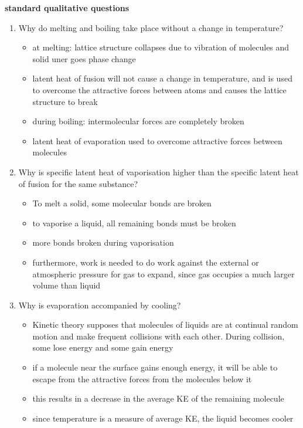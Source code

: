 \documentclass[a4paper, 10pt]{article}
\begin{document}
\textbf{standard qualitative questions}
\begin{enumerate}
   \item Why do melting and boiling take place without a change in temperature?
      \begin{itemize}
         \item at melting: lattice structure collapses due to vibration of molecules and solid uner goes phase change
         \item latent heat of fusion will not cause a change in temperature, and is used to overcome the attractive forces between atoms and causes the lattice structure to break
         \item during boiling: intermolecular forces are completely broken
         \item latent heat of evaporation used to overcome attractive forces between molecules
      \end{itemize}	
   \item Why is specific latent heat of vaporisation higher than the specific latent heat of fusion for the same substance?
      \begin{itemize}
         \item To melt a solid, some molecular bonds are broken
         \item to vaporise a liquid, all remaining bonds must be broken
         \item more bonds broken during vaporisation
         \item furthermore, work is needed to do work against the external or atmospheric pressure for gas to expand, since gas occupies a much larger volume than liquid
      \end{itemize}	
   \item Why is evaporation accompanied by cooling? 
      \begin{itemize}
         \item Kinetic theory supposes that molecules of liquids are at continual random motion and make frequent collisions with each other. During collision, some lose energy and some gain energy
         \item if a molecule near the surface gains enough energy, it will be able to escape from the attractive forces from the molecules below it
         \item this results in a decrease in the average KE of the remaining molecule
         \item since temperature is a measure of average KE, the liquid becomes cooler
      \end{itemize}	
\end{enumerate}	
\end{document}

